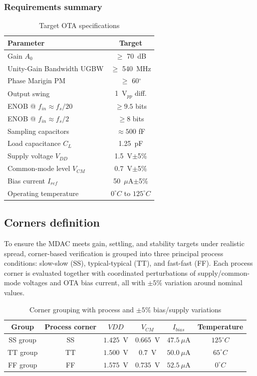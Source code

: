 \documentclass[11pt,a4paper]{article}
\begin{document}
\subsubsection{Requirements summary}
\begin{table}[H]
\centering
\caption{Target OTA specifications}
\label{tab:spec_OTA}
\begin{tabular}{lc}
\hline
\textbf{Parameter} & \textbf{Target} \\
\hline
Gain $A_0$ & $\ge$ 70~dB \\
Unity-Gain Bandwidth UGBW & $\ge$ 540~MHz \\
Phase Marigin PM & $\ge$ 60$^\circ$ \\
Output swing & 1~V$_{pp}$ diff. \\
ENOB @ $f_{in} \approx f_{s}/20$ & $\ge 9.5$ bits \\
ENOB @ $f_{in} \approx f_{s}/2$ & $\ge 8$ bits \\
Sampling capacitors   & $\approx 500$ fF \\
Load capacitance $C_L$ & 1.25~pF \\
Supply voltage $V_{DD}$ & 1.5~V$\pm$5\% \\
Common-mode level $V_{CM}$ & 0.7~V$\pm$5\% \\
Bias current $I_{ref}$ & 50~$\mu$A$\pm$5\% \\
Operating temperature  & $0^\circ C$ to  $125^\circ C$ \\
\hline
\end{tabular}
\end{table}


\subsection{Corners definition}
To ensure the MDAC meets gain, settling, and stability targets under realistic spread, corner-based verification is grouped into three principal process conditions: slow-slow (SS), typical-typical (TT), and fast-fast (FF). Each process corner is evaluated together with coordinated perturbations of supply/common-mode voltages and OTA bias current, all with $\pm 5\%$ variation around nominal values.
\begin{table}[h]
\centering
\caption{Corner grouping with process and $\pm 5\%$ bias/supply variations}
\label{tab:corner_grouping}
\begin{tabular}{cccccc}
\hline
\textbf{Group} & \textbf{Process corner} & \textbf{$VDD$} & \textbf{$V_{CM}$} &\textbf{$I_{bias}$} &Temperature \\
\hline
SS group & SS & $1.425$~V &$0.665$~V & $47.5~\mu$A &$125^\circ C$\\
TT group & TT & $1.500$~V &$0.7$~V & $50.0~\mu$A &$65^\circ C$\\
FF group & FF & $1.575$~V &$0.735$~V & $52.5~\mu$A &$0^\circ C$\\
\hline
\end{tabular}
\end{table}
\end{document}
